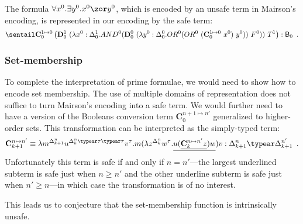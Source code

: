 \begin{example}
The formula  $\forall x^0 . \exists y^0 . x^0 \zor y^0$, which is
encoded by an unsafe term in Mairson's encoding, is represented in
our encoding by the safe term:
 $$\sentail \mathbf{C}_0^{1\mapsto 0} \left( \mathbf{D}_0^1~(\lambda x^0:\Delta_0^1. AND^0 ( \mathbf{D}_0^0 ~(\lambda y^0:\Delta_0^0. OR^0 (OR^0~(\mathbf{C}_0^{1\mapsto 0}~x^0)~y^0))~F^0))~T^1 \right) : \booltype_0 \enspace .$$
\end{example}


\subsubsection{Set-membership}
To complete the interpretation of prime formulae, we would need to show how to encode set membership. The use of multiple domains of representation does not suffice to turn Mairson's encoding into a safe term. We would further need to have a version of the Booleans conversion term $\mathbf{C}^{n+1\mapsto n'}_0$ generalized to higher-order sets.
This transformation can be interpreted as the simply-typed term:
$$ \mathbf{C}^{n\mapsto n'}_{k+1} \equiv \lambda m^{\Delta_{k+1}^n} u^{\Delta_k^n\typear \tau\typear \tau} v^\tau. m (\lambda z^{\Delta_k^n} w^\tau . \underline{u (\underline{\mathbf{C}^{n\mapsto n'}_k z}) w}) v : \Delta_{k+1}^n \typear \Delta_{k+1}^{n'} \enspace .$$
Unfortunately this term is safe if and only if $n=n'$---the largest
underlined subterm is safe just when $n\geq n'$ and the other
underline subterm is safe just when $n'\geq n$---in which case the transformation is of no interest.

This leads us to conjecture that the set-membership function is intrinsically unsafe.
\smallskip


